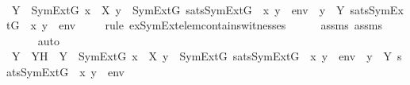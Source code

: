 \begin{isabellebody}
\isanewline
\ \ \isamarkupfalse%
\ {\isachardoublequoteopen}{\isasymexists}Y\ {\isasymin}\ SymExt{\isacharparenleft}{\kern0pt}G{\isacharparenright}{\kern0pt}{\isachardot}{\kern0pt}\ {\isasymforall}x\ {\isasymin}\ X{\isachardot}{\kern0pt}\ {\isacharparenleft}{\kern0pt}{\isacharparenleft}{\kern0pt}{\isasymexists}y\ {\isasymin}\ SymExt{\isacharparenleft}{\kern0pt}G{\isacharparenright}{\kern0pt}{\isachardot}{\kern0pt}\ sats{\isacharparenleft}{\kern0pt}SymExt{\isacharparenleft}{\kern0pt}G{\isacharparenright}{\kern0pt}{\isacharcomma}{\kern0pt}\ {\isasymphi}{\isacharcomma}{\kern0pt}\ {\isacharbrackleft}{\kern0pt}x{\isacharcomma}{\kern0pt}\ y{\isacharbrackright}{\kern0pt}\ {\isacharat}{\kern0pt}\ env{\isacharparenright}{\kern0pt}{\isacharparenright}{\kern0pt}\ {\isasymlongleftrightarrow}\ {\isacharparenleft}{\kern0pt}{\isasymexists}y\ {\isasymin}\ Y{\isachardot}{\kern0pt}\ sats{\isacharparenleft}{\kern0pt}SymExt{\isacharparenleft}{\kern0pt}G{\isacharparenright}{\kern0pt}{\isacharcomma}{\kern0pt}\ {\isasymphi}{\isacharcomma}{\kern0pt}\ {\isacharbrackleft}{\kern0pt}x{\isacharcomma}{\kern0pt}\ y{\isacharbrackright}{\kern0pt}\ {\isacharat}{\kern0pt}\ env{\isacharparenright}{\kern0pt}{\isacharparenright}{\kern0pt}{\isacharparenright}{\kern0pt}{\isachardoublequoteclose}\isanewline
\ \ \ \ \isamarkupfalse%
{\isacharparenleft}{\kern0pt}rule\ ex{\isacharunderscore}{\kern0pt}SymExt{\isacharunderscore}{\kern0pt}elem{\isacharunderscore}{\kern0pt}contains{\isacharunderscore}{\kern0pt}witnesses{\isacharparenright}{\kern0pt}\isanewline
\ \ \ \ \isamarkupfalse%
\ assms\ assms{}\isanewline
\ \ \ \ \isamarkupfalse%
\ auto\isanewline
\ \ \isamarkupfalse%
\ \isamarkupfalse%
\ Y\ \ YH\ {\isacharcolon}{\kern0pt}\ {\isachardoublequoteopen}Y\ {\isasymin}\ SymExt{\isacharparenleft}{\kern0pt}G{\isacharparenright}{\kern0pt}{\isachardoublequoteclose}\ {\isachardoublequoteopen}{\isasymforall}x\ {\isasymin}\ X{\isachardot}{\kern0pt}\ {\isacharparenleft}{\kern0pt}{\isacharparenleft}{\kern0pt}{\isasymexists}y\ {\isasymin}\ SymExt{\isacharparenleft}{\kern0pt}G{\isacharparenright}{\kern0pt}{\isachardot}{\kern0pt}\ sats{\isacharparenleft}{\kern0pt}SymExt{\isacharparenleft}{\kern0pt}G{\isacharparenright}{\kern0pt}{\isacharcomma}{\kern0pt}\ {\isasymphi}{\isacharcomma}{\kern0pt}\ {\isacharbrackleft}{\kern0pt}x{\isacharcomma}{\kern0pt}\ y{\isacharbrackright}{\kern0pt}\ {\isacharat}{\kern0pt}\ env{\isacharparenright}{\kern0pt}{\isacharparenright}{\kern0pt}\ {\isasymlongleftrightarrow}\ {\isacharparenleft}{\kern0pt}{\isasymexists}y\ {\isasymin}\ Y{\isachardot}{\kern0pt}\ sats{\isacharparenleft}{\kern0pt}SymExt{\isacharparenleft}{\kern0pt}G{\isacharparenright}{\kern0pt}{\isacharcomma}{\kern0pt}\ {\isasymphi}{\isacharcomma}{\kern0pt}\ {\isacharbrackleft}{\kern0pt}x{\isacharcomma}{\kern0pt}\ y{\isacharbrackright}{\kern0pt}\ {\isacharat}{\kern0pt}\ env{\isacharparenright}{\kern0pt}{\isacharparenright}{\kern0pt}{\isacharparenright}{\kern0pt}{\isachardoublequoteclose}\ \isamarkupfalse%

\end{isabellebody}
